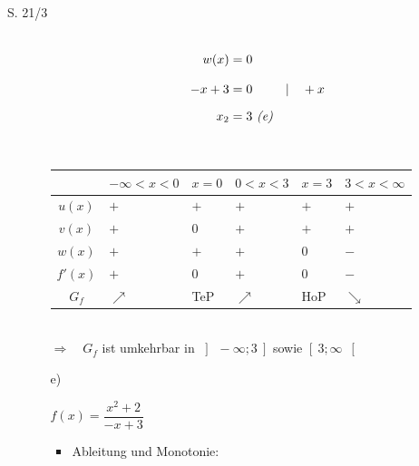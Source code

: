 \begin{Exercise}{S. 21/3}{}
\begin{enumerate}
\begin{enumerate}[label=\alph*)]
{\begin{itemize}[leftmargin=*]
{\begin{minipage}[t]{0.30\linewidth}
\begin{align*}
                            \end{align*}
                        \end{minipage}
                        \hfill
                        \begin{minipage}[t]{0.30\linewidth}
                            \begin{align*}
                                w(x) &= 0 && \\[2.0ex]
                                -x + 3 &= 0 &&| \quad + x\\[1.5ex]
                                x_{2} &= 3 \ \text{\textit{(e)}} &&
                            \end{align*}
                        \end{minipage}\\
                        \begin{tabularx}{0.95\linewidth}{c|X|X|X|X|X}
                            & $-\infty < x < 0$ & $x = 0$ & $0 < x < 3$ & $x = 3$ & $3 < x < \infty$ \\ \hline
                            $u(x)$ & $+$ & $+$ & $+$ & $+$ & $+$ \\ \hline
                            $v(x)$ & $+$ & $0$ & $+$ & $+$ & $+$ \\ \hline
                            $w(x)$ & $+$ & $+$ & $+$ & $0$ & $-$ \\ \hline
                            $f'(x)$ & $+$ & $0$ & $+$ & $0$ & $-$ \\ \hline
                            $G_{f}$ & $\nearrow$ & TeP & $\nearrow$ & HoP & $\searrow$ \\              
                        \end{tabularx}\\[4.0ex]
                        $\Rightarrow \quad G_{f}$ ist umkehrbar in $\left] \ -\infty; 3 \ \right]$ sowie $\left[ \ 3; \infty \ \right[$\\[-1.0ex]
                        }
                \end{itemize}
                }
            \item[e)] {
                $f(x) = \dfrac{x^{2}+2}{-x +3}$\\[-2.0ex]
                \begin{itemize}[leftmargin=*]
                    \item Ableitung und Monotonie: \\{
                        \vspace{-2.0ex}
}
\end{itemize}}
\end{enumerate}
\end{enumerate}
\end{Exercise}
